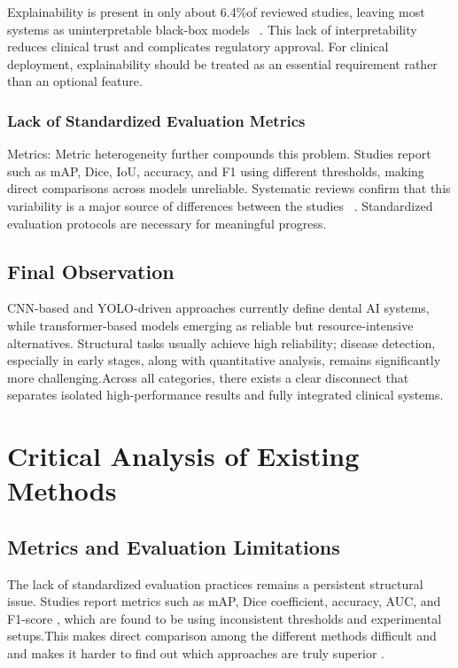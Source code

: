 \documentclass[conference]{IEEEtran}
\begin{document}
Explainability is present  in only about 6.4\%of reviewed studies, leaving most systems as uninterpretable black-box models ~\cite{chen2023deep}. This lack of interpretability reduces clinical trust and complicates regulatory approval. For clinical deployment, explainability should be treated as an essential requirement rather than an optional feature.

\subsubsection{Lack of Standardized Evaluation Metrics}

Metrics: Metric heterogeneity further compounds this problem. Studies report such as mAP, Dice, IoU, accuracy, and F1 using different thresholds, making direct comparisons across models unreliable. Systematic reviews confirm that this variability is a major source of differences between the studies ~\cite{bonfanti2025deep}. Standardized evaluation protocols are necessary for meaningful progress.

\subsection{Final Observation}

CNN-based and YOLO-driven approaches currently define dental AI systems, while transformer-based models emerging as reliable but resource-intensive alternatives. Structural tasks usually achieve high reliability; disease detection, especially in early stages, along with quantitative analysis, remains significantly more challenging.Across all categories, there exists a clear disconnect that separates isolated high-performance results and fully integrated clinical systems.

\section{Critical Analysis of Existing Methods}
\label{sec:critical}

\subsection{Metrics and Evaluation Limitations}

The lack of standardized evaluation practices remains a persistent structural issue. Studies report metrics such as mAP, Dice coefficient, accuracy, AUC, and F1-score , which are found to be using inconsistent thresholds and experimental setups.This  makes direct comparison among the different methods difficult and and makes it harder to find out which approaches are truly superior 
\cite{iacob2025automated,bonfanti2025deep,khubrani2025detection}.
\end{document}
